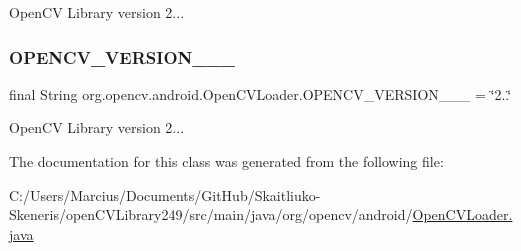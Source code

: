 Open\+CV Library version 2... \mbox{\label{classorg_1_1opencv_1_1android_1_1_open_c_v_loader_a08fa35fe0300fc28d2cc4f8cca2f235d}} 
\subsubsection{\texorpdfstring{O\+P\+E\+N\+C\+V\+\_\+\+V\+E\+R\+S\+I\+O\+N\+\_\+\_\+\_}{OPENCV\_VERSION\_2\_4\_9}}
{\footnotesize\ttfamily final String org.\+opencv.\+android.\+Open\+C\+V\+Loader.\+O\+P\+E\+N\+C\+V\+\_\+\+V\+E\+R\+S\+I\+O\+N\+\_\+\_\+\_ = \char`\"{}2..\char`\"{}\hspace{0.3cm}{\ttfamily [static]}}

Open\+CV Library version 2... 

The documentation for this class was generated from the following file\+:\begin{DoxyCompactItemize}
\item 
C\+:/\+Users/\+Marcius/\+Documents/\+Git\+Hub/\+Skaitliuko-\/\+Skeneris/open\+C\+V\+Library249/src/main/java/org/opencv/android/\mbox{\hyperlink{_open_c_v_loader_8java}{Open\+C\+V\+Loader.\+java}}\end{DoxyCompactItemize}
